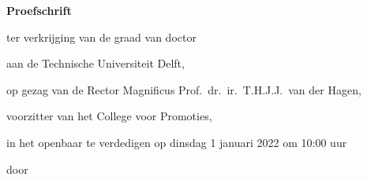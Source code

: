 \begin{titlepage}

\begin{center}

\vspace*{2\bigskipamount}

{\makeatletter
\titlestyle\bfseries\LARGE\@title
\makeatother}

{\makeatletter
\ifx\@subtitle\undefined\else
    \bigskip
    \titlefont\titleshape\Large\@subtitle
\fi
\makeatother}

\end{center}

\cleardoublepage
\thispagestyle{empty}

\begin{center}


\vspace*{2\bigskipamount}

{\makeatletter
\titlestyle\bfseries\LARGE\@title
\makeatother}

{\makeatletter
\ifx\@subtitle\undefined\else
    \bigskip
    \titlefont\titleshape\Large\@subtitle
\fi
\makeatother}

\vfill


{\Large\titlefont\bfseries Proefschrift}

\bigskip
\bigskip

ter verkrijging van de graad van doctor

aan de Technische Universiteit Delft,

op gezag van de Rector Magnificus Prof.~dr.~ir.~T.H.J.J.~van der Hagen,

voorzitter van het College voor Promoties,

in het openbaar te verdedigen op dinsdag 1 januari 2022 om 10:00 uur

\bigskip
\bigskip

door

\bigskip
\bigskip

\makeatletter
{\Large\titlefont\bfseries\@firstname\ {\titleshape\@lastname}}
\makeatother


\end{center}
\end{titlepage}
